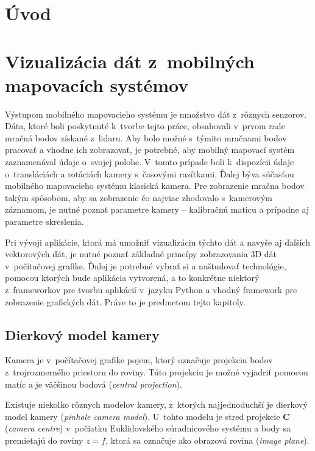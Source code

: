 %

\chapter{Úvod}

\chapter{Vizualizácia dát z~mobilných mapovacích systémov}

Výstupom mobilného mapovacieho systému je množstvo dát z~rôznych senzorov. Dáta, ktoré boli poskytnuté k~tvorbe tejto práce, obsahovali v~prvom rade mračná bodov získané z~lidaru. Aby bolo možné s~týmito mračnami bodov pracovať a vhodne ich zobrazovať, je potrebné, aby mobilný mapovací systém zaznamenával údaje o~svojej polohe. V~tomto prípade boli k~dispozícii údaje o~transláciách a rotáciách kamery s~časovými razítkami. Ďalej býva súčasťou mobilného mapovacieho systému klasická kamera. Pre zobrazenie mračna bodov takým spôsobom, aby sa zobrazenie čo najviac zhodovalo s~kamerovým záznamom, je nutné poznať parametre kamery -- kalibračnú maticu a prípadne aj parametre skreslenia.

Pri vývoji aplikácie, ktorá má umožniť vizualizáciu týchto dát a navyše aj ďalších vektorových dát, je nutné poznať základné princípy zobrazovania 3D dát v~počítačovej grafike. Ďalej je potrebné vybrať si a naštudovať technológie, pomocou ktorých bude aplikácia vytvorená, a to konkrétne niektorý z~frameworkov pre tvorbu aplikácií v~jazyku Python a vhodný framework pre zobrazenie grafických dát. Práve to je predmetom tejto kapitoly.

\section{Dierkový model kamery}

Kamera je v~počítačovej grafike pojem, ktorý označuje projekciu bodov z~trojrozmerného priestoru do roviny. Túto projekciu je možné vyjadriť pomocou matíc a je väčšinou bodová (\emph{central projection}).

Existuje niekoľko rôznych modelov kamery, z~ktorých najjednoduchší je dierkový model kamery (\emph{pinhole camera model}). U~tohto modelu je stred projekcie $\mathbf{C}$  (\emph{camera centre}) v~počiatku Euklidovského súradnicového systému a body sa premietajú do roviny $z = f$, ktorá sa označuje ako obrazová rovina (\emph{image plane}).

